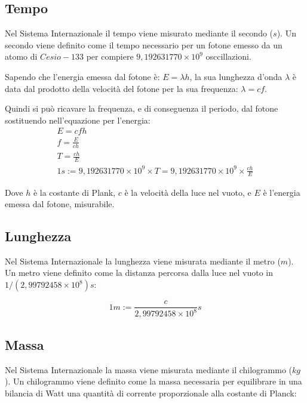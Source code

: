 \documentclass{article}
\numberwithin{equation}{subsection}
\begin{document}
\subsection{Tempo}

Nel Sistema Internazionale il tempo viene misurato mediante 
il secondo ($s$).
Un secondo viene definito come il tempo necessario per un 
fotone emesso da un atomo di $Cesio-133$ per compiere 
$9{,}192631770\times 10^9$ osccillazioni.



Sapendo che l'energia emessa dal fotone è: 
$E= \lambda h$, la sua lunghezza 
d'onda $\lambda$ è data dal prodotto della velocità del fotone 
per la sua frequenza: $\lambda  = cf$.



Quindi si può ricavare la frequenza, e di conseguenza il 
periodo, dal fotone sostituendo nell'equazione per l'energia: 
\begin{gather*}
    E = cfh\\
    f = \displaystyle\frac{E}{ch}\\
    T = \displaystyle\frac{ch}{E}\\
    1s := 9{,}192631770\times 10^9 \times T = 9{,}192631770\times 10^9 \times \displaystyle\frac{ch}{E}
\end{gather*}

Dove $h$ è la costante di Plank, $c$ è la velocità della luce nel vuoto, e $E$ è l'energia emessa dal fotone, misurabile.

\subsection{Lunghezza}
Nel Sistema Internazionale la lunghezza viene misurata 
mediante il metro ($m$). Un metro viene definito come la 
distanza percorsa dalla luce nel vuoto in 
$1/(2{,}99792458\times 10^8)s$:

\begin{equation*}
    1m := \displaystyle\frac{c}{2{,}99792458\times 10^8}s
\end{equation*}

\subsection{Massa}
Nel Sistema Internazionale la massa viene misurata mediante 
il chilogrammo ($kg$). Un chilogrammo viene definito come la 
massa necessaria per equilibrare in una bilancia di Watt una 
quantità di corrente proporzionale alla costante di Planck:
\end{document}
